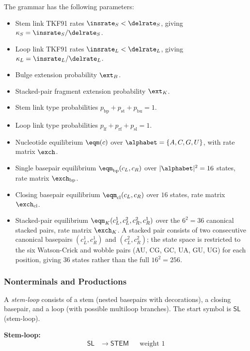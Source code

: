 The grammar has the following parameters:
\begin{itemize}
\item Stem link TKF91 rates $\insrate_S < \delrate_S$,
  giving $\kappa_S = \insrate_S / \delrate_S$.
\item Loop link TKF91 rates $\insrate_L < \delrate_L$,
  giving $\kappa_L = \insrate_L / \delrate_L$.
\item Bulge extension probability $\ext_B$.
\item Stacked-pair fragment extension probability $\ext_K$.
\item Stem link type probabilities
  $p_{\mathrm{bp}} + p_{\mathrm{st}} + p_{\mathrm{bu}} = 1$.
\item Loop link type probabilities
  $p_{\mathrm{lf}} + p_{\mathrm{rf}} + p_{\mathrm{sl}} = 1$.
\item Nucleotide equilibrium $\eqm(c)$ over $\alphabet = \{A,C,G,U\}$,
  with rate matrix $\exch$.
\item Single basepair equilibrium $\eqm_{\mathrm{bp}}(c_L, c_R)$
  over $|\alphabet|^2 = 16$ states, rate matrix $\exch_{\mathrm{bp}}$.
\item Closing basepair equilibrium $\eqm_{\mathrm{cl}}(c_L, c_R)$
  over $16$ states, rate matrix $\exch_{\mathrm{cl}}$.
\item Stacked-pair equilibrium
  $\eqm_K(c_L^1, c_L^2, c_R^2, c_R^1)$
  over the $6^2 = 36$ canonical stacked pairs, rate matrix $\exch_K$.
  A stacked pair consists of two consecutive canonical basepairs
  $(c_L^1, c_R^1)$ and $(c_L^2, c_R^2)$; the state space is
  restricted to the six Watson-Crick and wobble pairs
  (AU, CG, GC, UA, GU, UG) for each position,
  giving 36 states rather than the full $16^2 = 256$.
\end{itemize}

\subsubsection{Nonterminals and Productions}

A \emph{stem-loop} consists of a stem (nested basepairs with
decorations), a closing basepair, and a loop (with possible
multiloop branches).
The start symbol is $\mathsf{SL}$ (stem-loop).

\medskip
\noindent\textbf{Stem-loop:}
\begin{align}
\mathsf{SL} &\to \mathsf{STEM}
  && \text{weight } 1
  \label{eq:sl}
\end{align}

